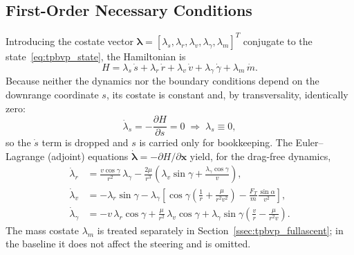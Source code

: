 \subsection{First-Order Necessary Conditions}
\label{ssec:tpbvp_pmp}

Introducing the costate vector
$\boldsymbol{\lambda} = [\lambda_s,\lambda_r,\lambda_v,\lambda_\gamma,\lambda_m]^T$
conjugate to the state~\eqref{eq:tpbvp_state}, the Hamiltonian is
\begin{equation}
  H = \lambda_s\,\dot s + \lambda_r\,\dot r + \lambda_v\,\dot v
    + \lambda_\gamma\,\dot\gamma + \lambda_m\,\dot m.
  \label{eq:tpbvp_hamiltonian}
\end{equation}
Because neither the dynamics nor the boundary conditions depend on the downrange
coordinate $s$, its costate is constant and, by transversality, identically
zero:
\begin{equation}
  \dot\lambda_s = -\frac{\partial H}{\partial s} = 0
  \;\Longrightarrow\; \lambda_s \equiv 0,
  \label{eq:tpbvp_lams}
\end{equation}
so the $\dot s$ term is dropped and $s$ is carried only for bookkeeping.  The
Euler--Lagrange (adjoint) equations $\dot{\boldsymbol\lambda} = -\partial H/\partial\mathbf{x}$
yield, for the drag-free dynamics,
\begin{align}
  \dot\lambda_r &= \frac{v\cos\gamma}{r^2}\,\lambda_\gamma
     - \frac{2\mu}{r^3}\!\left(\lambda_v\sin\gamma
       + \frac{\lambda_\gamma\cos\gamma}{v}\right), \label{eq:tpbvp_lamr}\\[4pt]
  \dot\lambda_v &= -\lambda_r\sin\gamma
     - \lambda_\gamma\!\left[\cos\gamma\!\left(\frac{1}{r} + \frac{\mu}{r^2 v^2}\right)
       - \frac{F_T}{m}\frac{\sin\alpha}{v^2}\right], \label{eq:tpbvp_lamv}\\[4pt]
  \dot\lambda_\gamma &= -v\,\lambda_r\cos\gamma
     + \frac{\mu}{r^2}\,\lambda_v\cos\gamma
     + \lambda_\gamma\sin\gamma\!\left(\frac{v}{r} - \frac{\mu}{r^2 v}\right).
     \label{eq:tpbvp_lamg}
\end{align}
The mass costate $\lambda_m$ is treated separately in
Section~\ref{ssec:tpbvp_fullascent}; in the baseline it does not affect the
steering and is omitted.

